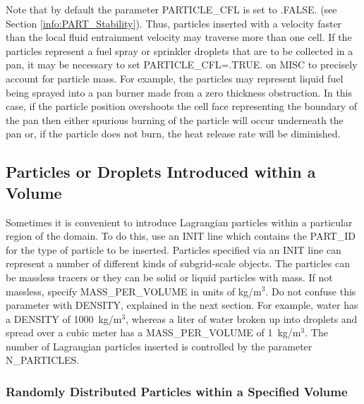 \documentclass[11pt]{book}
\begin{document}
Note that by default the parameter {\ct PARTICLE\_CFL} is set to {\ct .FALSE.} (see Section \ref{info:PART_Stability}).  Thus, particles inserted with a velocity faster than the local fluid entrainment velocity may traverse more than one cell.  If the particles represent a fuel spray or sprinkler droplets that are to be collected in a pan, it may be necessary to set {\ct PARTICLE\_CFL=.TRUE.} on {\ct MISC} to precisely account for particle mass.  For example, the particles may represent liquid fuel being sprayed into a pan burner made from a zero thickness obstruction.  In this case, if the particle position overshoots the cell face representing the boundary of the pan then either spurious burning of the particle will occur underneath the pan or, if the particle does not burn, the heat release rate will be diminished.


\subsection{Particles or Droplets Introduced within a Volume}
\label{info:initial_droplets}

Sometimes it is convenient to introduce Lagrangian particles within a particular region of the domain. To do this, use an {\ct INIT} line which contains the {\ct PART\_ID} for the type of particle to be inserted. Particles specified via an {\ct INIT} line can represent a number of different kinds of subgrid-scale objects. The particles can be massless tracers or they can be solid or liquid particles with mass. If not massless, specify {\ct MASS\_PER\_VOLUME} in units of kg/m$^3$. Do not confuse this parameter with {\ct DENSITY}, explained in the next section. For example, water has a {\ct DENSITY} of 1000~kg/m$^3$, whereas a liter of water broken up into droplets and spread over a cubic meter has a {\ct MASS\_PER\_VOLUME} of 1~kg/m$^3$. The number of Lagrangian particles inserted is controlled by the parameter {\ct N\_PARTICLES}.

\subsubsection{Randomly Distributed Particles within a Specified Volume}
\end{document}
